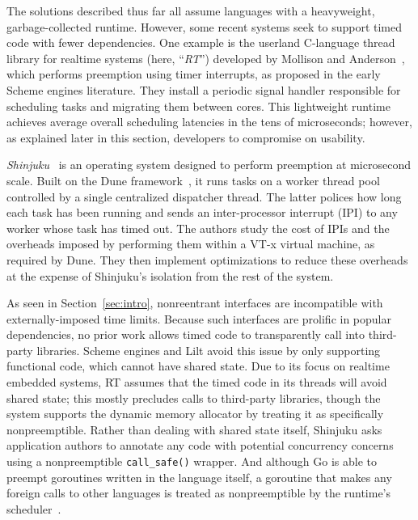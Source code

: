 The solutions described thus far all assume languages with a heavyweight,
garbage-collected runtime.  However, some recent systems seek
to support timed code with fewer
dependencies.  One example is the userland C-language thread library for realtime
systems (here, ``\textit{RT}'') developed by Mollison and
Anderson~\cite{mollison:rtas2013}, which performs
preemption using timer interrupts, as proposed in the early Scheme engines
literature.  They install a periodic signal handler responsible for scheduling
tasks and migrating them between cores.  This lightweight runtime
achieves average overall scheduling latencies in the tens of microseconds;
however, as explained later in this section, developers to compromise on usability.

\textit{Shinjuku}~\cite{Kaffes:nsdi2019} is an operating system designed to perform
preemption at microsecond scale.  Built on the Dune framework~\cite{Belay:osdi2012},
it runs tasks on a worker thread pool controlled by a single centralized
dispatcher thread.  The latter polices how long each task has been running and
sends an inter-processor interrupt (IPI) to any worker whose task has timed out.
The authors study the cost of IPIs and the overheads
imposed by performing them within a VT-x virtual machine, as required by Dune.  They
then implement optimizations to reduce these overheads at the expense of Shinjuku's
isolation from the rest of the system.

As seen in Section~\ref{sec:intro}, nonreentrant interfaces are
incompatible with externally-imposed time limits.  Because such interfaces are
prolific in popular dependencies, no prior work allows timed code to transparently
call into third-party libraries.  Scheme engines and
Lilt avoid this issue by only supporting functional code, which cannot have shared
state.  Due to its focus on realtime embedded systems, RT assumes
that the timed code in its threads will avoid shared state; this mostly precludes
calls to third-party libraries, though the system supports the dynamic memory
allocator by treating it as specifically nonpreemptible.  Rather than dealing with
shared state itself, Shinjuku asks application authors to annotate any code with
potential concurrency concerns using a nonpreemptible \texttt{call\_safe()} wrapper.
And although Go is able to preempt goroutines written in the language
itself, a
goroutine that makes any foreign calls to other languages is treated as
nonpreemptible by the runtime's scheduler~\cite{www-golang-fficall}.
